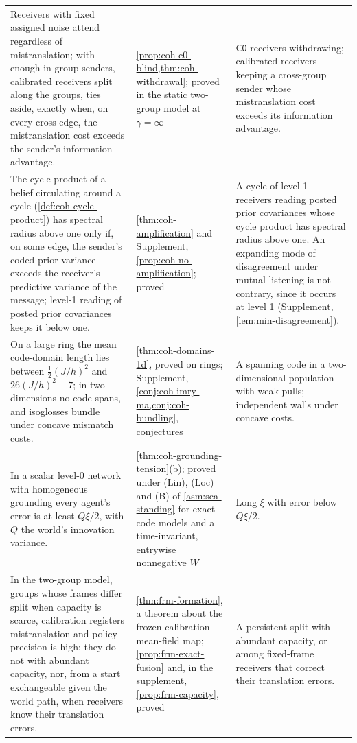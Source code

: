 \begin{longtable}{@{}>{\raggedright\arraybackslash}p{6.5cm}>{\raggedright\arraybackslash}p{3.9cm}>{\raggedright\arraybackslash}p{5.1cm}@{}}
\addlinespace
Receivers with fixed assigned noise attend regardless of mistranslation; with enough in-group senders, calibrated receivers split along the groups, ties aside, exactly when, on every cross edge, the mistranslation cost exceeds the sender's information advantage. & \cref{prop:coh-c0-blind,thm:coh-withdrawal}; proved in the static two-group model at $\gamma=\infty$ & $\mathsf{C0}$ receivers withdrawing; calibrated receivers keeping a cross-group sender whose mistranslation cost exceeds its information advantage.\\
\addlinespace
The cycle product of a belief circulating around a cycle (\cref{def:coh-cycle-product}) has spectral radius above one only if, on some edge, the sender's coded prior variance exceeds the receiver's predictive variance of the message; level-1 reading of posted prior covariances keeps it below one. & \cref{thm:coh-amplification} and Supplement, \cref{prop:coh-no-amplification}; proved & A cycle of level-1 receivers reading posted prior covariances whose cycle product has spectral radius above one. An expanding mode of disagreement under mutual listening is not contrary, since it occurs at level 1 (Supplement, \cref{lem:min-disagreement}).\\
\addlinespace
On a large ring the mean code-domain length lies between $\frac12(J/h)^2$ and $26(J/h)^2+7$; in two dimensions no code spans, and isoglosses bundle under concave mismatch costs. & \cref{thm:coh-domains-1d}, proved on rings; Supplement, \cref{conj:coh-imry-ma,conj:coh-bundling}, conjectures & A spanning code in a two-dimensional population with weak pulls; independent walls under concave costs.\\
\addlinespace
In a scalar level-0 network with homogeneous grounding every agent's error is at least $Q\xi/2$, with $Q$ the world's innovation variance. & \cref{thm:coh-grounding-tension}(b); proved under (Lin), (Loc) and (B) of \cref{asm:sca-standing} for exact code models and a time-invariant, entrywise nonnegative $W$ & Long $\xi$ with error below $Q\xi/2$.\\
\addlinespace
In the two-group model, groups whose frames differ split when capacity is scarce, calibration registers mistranslation and policy precision is high; they do not with abundant capacity, nor, from a start exchangeable given the world path, when receivers know their translation errors. & \cref{thm:frm-formation}, a theorem about the frozen-calibration mean-field map; \cref{prop:frm-exact-fusion} and, in the supplement, \cref{prop:frm-capacity}, proved & A persistent split with abundant capacity, or among fixed-frame receivers that correct their translation errors.\\
\end{longtable}
\endgroup

